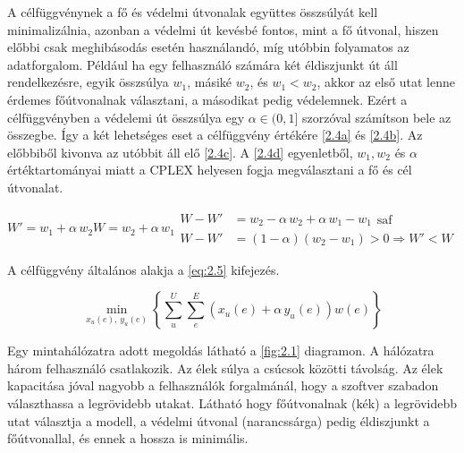 \documentclass[a4paper,oneside]{article}
\begin{document}
A célfüggvénynek a fő és védelmi útvonalak együttes összsúlyát kell minimalizálnia,
azonban a védelmi út kevésbé fontos, mint a fő útvonal, hiszen előbbi csak meghibásodás esetén
használandó, míg utóbbin folyamatos az adatforgalom.
Például ha egy felhasználó számára két éldiszjunkt út áll rendelkezésre, egyik összsúlya $w_1$, másiké $w_2$,
és $w_1 < w_2$, akkor az első utat lenne érdemes főútvonalnak választani, a másodikat pedig védelemnek.
Ezért a célfüggvényben a védelemi út összsúlya egy $\alpha \in (0, 1]$ szorzóval számítson bele az összegbe.
Így a két lehetséges eset a célfüggvény értékére \eqref{2.4a} és \eqref{2.4b}.
Az előbbiből kivonva az utóbbit áll elő \eqref{2.4c}.
A \eqref{2.4d} egyenletből, $w_1, w_2$ és $\alpha$ értéktartományai miatt
a CPLEX helyesen fogja megválasztani a fő és cél útvonalat.

\begin{subequations}
  \begin{equation}
    W' = w_1 + \alpha \, w_2 \label{2.4a}
  \end{equation}
  \begin{equation}
    W = w_2 + \alpha \, w_1 \label{2.4b}
  \end{equation}
  \begin{align}
    W - W' &= w_2 - \alpha \, w_2 + \alpha \, w_1 - w_1 \substack{\text{saf}} \label{2.4c} \\
    W - W' &= \left( 1 - \alpha \right)\left( w_2 - w_1 \right) > 0 \Rightarrow W' < W \label{2.4d}
  \end{align}
\end{subequations}

A célfüggvény általános alakja a \eqref{eq:2.5} kifejezés.

\begin{equation}
  \min_{x_u(e), \, y_u(e)} \left \lbrace \sum_{u}^{U} \sum_{e}^{E} \left( x_u(e) + \alpha \, y_u(e) \right) w(e) \right \rbrace \label{eq:2.5}
\end{equation}

Egy mintahálózatra adott megoldás látható a \ref{fig:2.1} diagramon.
A hálózatra három felhasználó csatlakozik.
Az élek súlya a csúcsok közötti távolság.
Az élek kapacitása jóval nagyobb a felhasználók forgalmánál, hogy a szoftver szabadon választhassa a legrövidebb utakat.
Látható hogy főútvonalnak (kék) a legrövidebb utat választja a modell,
a védelmi útvonal (narancssárga) pedig éldiszjunkt a főútvonallal, és ennek a hossza is minimális.
\end{document}
